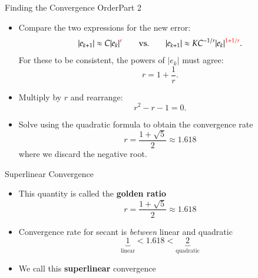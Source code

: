 \documentclass[10pt]{beamer}
\begin{document}
\begin{frame}{Finding the Convergence Order}{Part 2}

\begin{itemize}

    \item[5.] Compare the two expressions for the new error:
    \[
    |e_{k+1}|
    \approx
    C|e_k|^{\textcolor{red}{r}}
    \qquad \text{vs.} \qquad
    |e_{k+1}|
    \approx
    K C^{-1/r}|e_k|^{\textcolor{red}{1+1/r}}.
    \]
    For these to be consistent, the powers of $|e_k|$ must agree:
    \[
    r=1+\frac{1}{r}.
    \]

    \item<2->[6.] Multiply by $r$ and rearrange:
    \[
    r^2-r-1=0.
    \]

    \item<3->[7.] Solve using the quadratic formula to obtain the convergence rate
    \[
    \boxed{
    r=\frac{1+\sqrt{5}}{2}\approx1.618
    }
    \]
    where we discard the negative root.


\end{itemize}

\end{frame}


\begin{frame}{Superlinear Convergence}

\begin{itemize}
    \item This quantity is called the \textbf{golden ratio}
    \[
    r=\frac{1+\sqrt{5}}{2}\approx1.618
    \]
    \item Convergence rate for secant is \textit{between} linear and quadratic 
    $$
        \underbrace{1}_{\text{linear}} < 1.618 < \underbrace{2}_{\text{quadratic}}
    $$
    \item We call this \textbf{superlinear} convergence
\end{itemize}

    
\end{frame}

\end{document}
